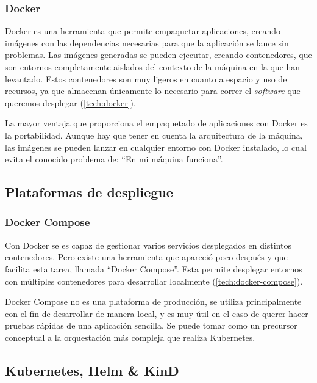 \subsubsection*{Docker}
\label{subsec:docker}

Docker es una herramienta que permite empaquetar aplicaciones, creando imágenes con las dependencias necesarias para que la aplicación se lance sin problemas. Las imágenes generadas se pueden ejecutar, creando contenedores, que son entornos completamente aislados del contexto de la máquina en la que han levantado. Estos contenedores son muy ligeros en cuanto a espacio y uso de recursos, ya que almacenan únicamente lo necesario para correr el \textit{software} que queremos desplegar (\ref{tech:docker}).

La mayor ventaja que proporciona el empaquetado de aplicaciones con Docker es la portabilidad. Aunque hay que tener en cuenta la arquitectura de la máquina, las imágenes se pueden lanzar en cualquier entorno con Docker instalado, lo cual evita el conocido problema de: ``En mi máquina funciona''.

\subsection*{Plataformas de despliegue}

\subsubsection*{Docker Compose}
\label{subsec:docker-compose}

Con Docker se es capaz de gestionar varios servicios desplegados en distintos contenedores. Pero existe una herramienta que apareció poco después y que facilita esta tarea, llamada ``Docker Compose''\cite{docker-compose}. Esta permite desplegar entornos con múltiples contenedores para desarrollar localmente (\ref{tech:docker-compose}).

Docker Compose no es una plataforma de producción, se utiliza principalmente con el fin de desarrollar de manera local, y es muy útil en el caso de querer hacer pruebas rápidas de una aplicación sencilla. Se puede tomar como un precursor conceptual a la orquestación más compleja que realiza Kubernetes.

\subsection*{Kubernetes, Helm \& KinD}
\label{subsec:k8shelm}

